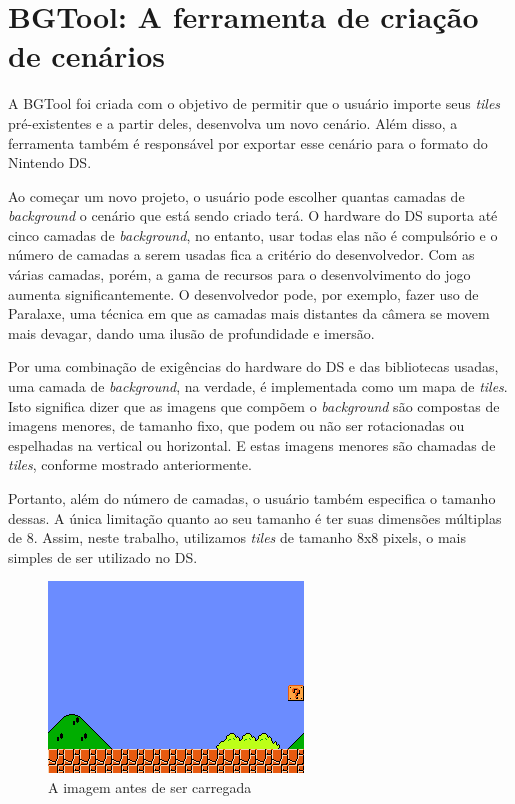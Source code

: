 \documentclass[brazil]{abnt}
\begin{document}
\section{BGTool: A ferramenta de criação de cenários}

A BGTool foi criada com o objetivo de permitir que o usuário importe seus \textit{tiles} pré-existentes e a partir deles, desenvolva um novo cenário. Além disso, a ferramenta também é responsável por exportar esse cenário para o formato do Nintendo DS. 

Ao começar um novo projeto, o usuário pode escolher quantas camadas de \textit{background} o cenário que está sendo criado terá. O hardware do DS suporta até cinco camadas de \textit{background}, no entanto, usar todas elas não é compulsório e o número de camadas a serem usadas fica a critério do desenvolvedor. Com as várias camadas, porém, a gama de recursos para o desenvolvimento do jogo aumenta significantemente. O desenvolvedor pode, por exemplo, fazer uso de Paralaxe, uma técnica em que as camadas mais distantes da câmera se movem mais devagar, dando uma ilusão de profundidade e imersão.

Por uma combinação de exigências do hardware do DS e das bibliotecas usadas, uma camada de \textit{background}, na verdade, é implementada como um mapa de \textit{tiles}. Isto significa dizer que as imagens que compõem o \textit{background} são compostas de imagens menores, de tamanho fixo, que podem ou não ser rotacionadas ou espelhadas na vertical ou horizontal. E estas imagens menores são chamadas de \textit{tiles}, conforme mostrado anteriormente.

Portanto, além do número de camadas, o usuário também especifica o tamanho dessas. A única limitação quanto ao seu tamanho é ter suas dimensões múltiplas de 8. Assim, neste trabalho, utilizamos \textit{tiles} de tamanho 8x8 pixels, o mais simples de ser utilizado no DS.

\begin{figure}[h!]
\centering
\includegraphics[scale=1]{imgs/exemplo.png}
\caption{A imagem antes de ser carregada} 
\end{figure}
\end{document}
